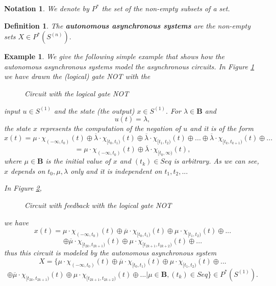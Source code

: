 \documentclass[12pt]{article}\usepackage{amsmath}
\newtheorem{definition}[theorem]{Definition}
\newtheorem{example}[theorem]{Example}
\newtheorem{notation}[theorem]{Notation}
\begin{document}
\begin{notation}
We denote by $P^{\ast}$ the set of the non-empty subsets of a set.
\end{notation}

\begin{definition}
The \textbf{autonomous asynchronous systems} are the non-empty sets $X\in
P^{\ast}(S^{(n)}).$
\end{definition}

\begin{example}
\label{Exa13}We give the following simple example that shows how the
autonomous asynchronous systems model the asynchronous circuits. In Figure
\ref{preliminaries1} we have drawn the (logical) gate NOT with the\begin{figure}
[ptb]
\begin{center}
\caption{Circuit with the logical gate NOT}\label{preliminaries1}\end{center}
\end{figure}
input $u\in S^{(1)}$ and the state (the output) $x\in S^{(1)}.$ For
$\lambda\in\mathbf{B}$ and\[
u(t)=\lambda,
\]
the state $x$ represents the computation of the negation of $u$ and it is of
the form\[
x(t)=\mu\cdot\chi_{(-\infty,t_{0})}(t)\oplus\overline{\lambda}\cdot
\chi_{\lbrack t_{0},t_{1})}(t)\oplus\overline{\lambda}\cdot\chi_{\lbrack
t_{1},t_{2})}(t)\oplus...\oplus\overline{\lambda}\cdot\chi_{\lbrack
t_{k},t_{k+1})}(t)\oplus...
\]\[
=\mu\cdot\chi_{(-\infty,t_{0})}(t)\oplus\overline{\lambda}\cdot\chi_{\lbrack
t_{0},\infty)}(t),
\]
where $\mu\in\mathbf{B}$ is the initial value of $x$ and $(t_{k})\in Seq$ is
arbitrary. As we can see, $x$ depends on $t_{0},\mu,\lambda$ only and it is
independent on $t_{1},t_{2},...$

In Figure \ref{preliminaries2},\begin{figure}
[ptb]
\begin{center}
\caption{Circuit with feedback with the logical gate NOT}\label{preliminaries2}\end{center}
\end{figure}
we have\[
x(t)=\mu\cdot\chi_{(-\infty,t_{0})}(t)\oplus\overline{\mu}\cdot\chi_{\lbrack
t_{0},t_{1})}(t)\oplus\mu\cdot\chi_{\lbrack t_{1},t_{2})}(t)\oplus...
\]\[
\oplus\overline{\mu}\cdot\chi_{\lbrack t_{2k},t_{2k+1})}(t)\oplus\mu\cdot
\chi_{\lbrack t_{2k+1},t_{2k+2})}(t)\oplus...
\]
thus this circuit is modeled by the autonomous asynchronous system\[
X=\{\mu\cdot\chi_{(-\infty,t_{0})}(t)\oplus\overline{\mu}\cdot\chi_{\lbrack
t_{0},t_{1})}(t)\oplus\mu\cdot\chi_{\lbrack t_{1},t_{2})}(t)\oplus...
\]\[
\oplus\overline{\mu}\cdot\chi_{\lbrack t_{2k},t_{2k+1})}(t)\oplus\mu\cdot
\chi_{\lbrack t_{2k+1},t_{2k+2})}(t)\oplus...|\mu\in\mathbf{B},(t_{k})\in
Seq\}\in P^{\ast}(S^{(1)}).
\]

\end{example}
\end{document}
